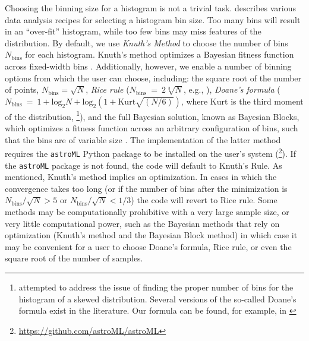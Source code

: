 \documentclass{emulateapj}
\begin{document}
Choosing the binning size for a histogram is not a trivial task.  \citet{hogg08} describes various data analysis recipes for selecting a histogram bin size. Too many bins will result in an ``over-fit'' histogram, while too few bins may miss features of the distribution. 
By default, we use \emph{Knuth's Method} to choose the number of bins $N_\mathrm{bins}$ for each histogram. Knuth's method  optimizes a Bayesian fitness function across fixed-width bins \citep{knuth06}. Additionally, however, we enable a number of binning options from which the user can choose, including: 
the square root of the number of points, $N_\mathrm{bins}=\sqrt{N}$, \emph{Rice rule} ($N_\mathrm{bins}~=~2\sqrt[3]{N}$, e.g., \citealt{hastie09}), 
\emph{Doane's formula} ($N_\mathrm{bins}~=~1 + \mathrm{log}_2{N} + \mathrm{log}_2\left(1 + \mathrm{Kurt}\sqrt{(N / 6)}\right)$, where Kurt is the third moment of the distribution, \citealt{doane76}\footnote{\citet{doane76} attempted to address the issue of finding the proper number of bins for the histogram of a skewed distribution. Several versions of the so-called Doane's formula exist in the literature. Our formula can be found, for example, in \citealt{bonate11}}), and the full Bayesian solution, known as Bayesian Blocks, which optimizes a fitness function across an arbitrary configuration of bins, such that the bins are of variable size \citep{scargle13}. The implementation of the latter method requires the \verb=astroML= Python package to be installed on the user's system (\citealt{astroml}\footnote{\url{https://github.com/astroML/astroML}}). If the \verb=astroML= package is not found, the code will default to Knuth's Rule. 
As mentioned, Knuth's method implies an optimization. In cases in which the convergence takes too long (or if the number of bins after the minimization is  $N_\mathrm{bins}/\sqrt{N} > 5$ or $N_\mathrm{bins}/\sqrt{N} < 1/3$) the code will revert to Rice rule.
Some methods may be computationally prohibitive with a very large sample size, or very little computational power, such as the Bayesian methods that rely on optimization (Knuth's method and the Bayesian Block method) in which case it may be convenient for a user to choose Doane's formula, Rice rule, or even the square root of the number of samples. 
\end{document}
